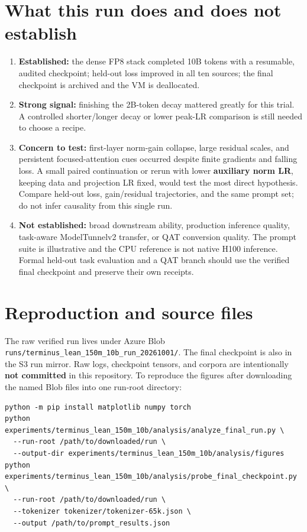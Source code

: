\documentclass[10pt,a4paper]{article}
\newcommand{\tightlist}{\setlength{\itemsep}{0pt}\setlength{\parskip}{0pt}}
\begin{document}
\section{What this run does and does not
establish}\label{what-this-run-does-and-does-not-establish}

\begin{enumerate}
\def\labelenumi{\arabic{enumi}.}
\tightlist
\item
  \textbf{Established:} the dense FP8 stack completed 10B tokens with a
  resumable, audited checkpoint; held-out loss improved in all ten
  sources; the final checkpoint is archived and the VM is deallocated.
\item
  \textbf{Strong signal:} finishing the 2B-token decay mattered greatly
  for this trial. A controlled shorter/longer decay or lower peak-LR
  comparison is still needed to choose a recipe.
\item
  \textbf{Concern to test:} first-layer norm-gain collapse, large
  residual scales, and persistent focused-attention cues occurred
  despite finite gradients and falling loss. A small paired continuation
  or rerun with lower \textbf{auxiliary norm LR}, keeping data and
  projection LR fixed, would test the most direct hypothesis. Compare
  held-out loss, gain/residual trajectories, and the same prompt set; do
  not infer causality from this single run.
\item
  \textbf{Not established:} broad downstream ability, production
  inference quality, task-aware ModelTunnelv2 transfer, or QAT
  conversion quality. The prompt suite is illustrative and the CPU
  reference is not native H100 inference. Formal held-out task
  evaluation and a QAT branch should use the verified final checkpoint
  and preserve their own receipts.
\end{enumerate}

\section{Reproduction and source
files}\label{reproduction-and-source-files}

The raw verified run lives under Azure Blob
\texttt{runs/terminus\_lean\_150m\_10b\_run\_20261001/}. The final
checkpoint is also in the S3 run mirror. Raw logs, checkpoint tensors,
and corpora are intentionally \textbf{not committed} in this repository.
To reproduce the figures after downloading the named Blob files into one
run-root directory:

\begin{verbatim}
python -m pip install matplotlib numpy torch
python experiments/terminus_lean_150m_10b/analysis/analyze_final_run.py \
  --run-root /path/to/downloaded/run \
  --output-dir experiments/terminus_lean_150m_10b/analysis/figures
python experiments/terminus_lean_150m_10b/analysis/probe_final_checkpoint.py \
  --run-root /path/to/downloaded/run \
  --tokenizer tokenizer/tokenizer-65k.json \
  --output /path/to/prompt_results.json
\end{verbatim}
\end{document}
